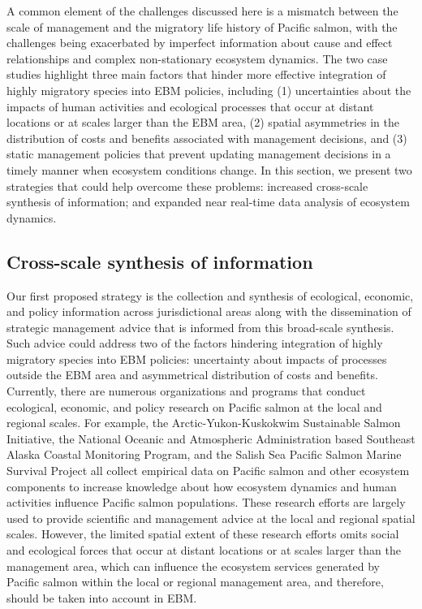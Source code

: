 A common element of the challenges discussed here is a mismatch between the
scale of management and the migratory life history of Pacific salmon, with the
challenges being exacerbated by imperfect information about cause and effect
relationships and complex non-stationary ecosystem dynamics. The two case
studies highlight three main factors that hinder more effective integration of
highly migratory species into EBM policies, including (1) uncertainties about
the impacts of human activities and ecological processes that occur at distant
locations or at scales larger than the EBM area, (2) spatial asymmetries in the
distribution of costs and benefits associated with management decisions, and (3)
static management policies that prevent updating management decisions in a
timely manner when ecosystem conditions change. In this section, we present two
strategies that could help overcome these problems: increased cross-scale
synthesis of information; and expanded near real-time data analysis of ecosystem
dynamics.


\subsection{Cross-scale synthesis of information}

Our first proposed strategy is the collection and synthesis of ecological,
economic, and policy information across jurisdictional areas along with the
dissemination of strategic management advice that is informed from this
broad-scale synthesis. Such advice could address two of the factors hindering
integration of highly migratory species into EBM policies: uncertainty about
impacts of processes outside the EBM area and asymmetrical distribution of
costs and benefits. Currently, there are numerous organizations and programs
that conduct ecological, economic, and policy research on Pacific salmon at the
local and regional scales. For example, the Arctic-Yukon-Kuskokwim Sustainable
Salmon Initiative, the National Oceanic and Atmospheric Administration based
Southeast Alaska Coastal Monitoring Program, and the Salish Sea Pacific Salmon
Marine Survival Project all collect empirical data on Pacific salmon and other
ecosystem components to increase knowledge about how ecosystem dynamics and
human activities influence Pacific salmon populations. These research efforts
are largely used to provide scientific and management advice at the local and
regional spatial scales. However, the limited spatial extent of these research
efforts omits social and ecological forces that occur at distant locations or at
scales larger than the management area, which can influence the ecosystem
services generated by Pacific salmon within the local or regional management
area, and therefore, should be taken into account in EBM.

